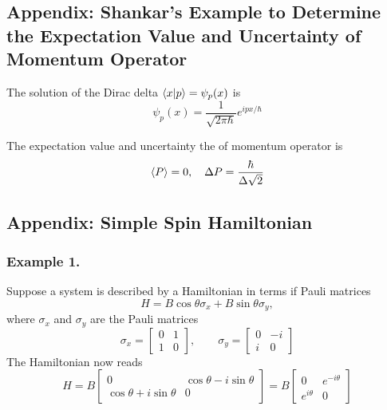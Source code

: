 \documentclass[../../../main.tex]{subfiles}
\begin{document}
\subsection{Appendix: Shankar's Example to Determine the Expectation Value and Uncertainty of Momentum Operator}
The solution of the Dirac delta $\braket{x|p}=\psi_p(x)$ is
\begin{equation*}
    \psi_p(x)=\frac{1 }{\sqrt{2\pi \hbar}}e^{ipx/\hbar}
\end{equation*}

The expectation value and uncertainty the of momentum operator is
\begin{equation*}
    \braket{P}=0,\quad\Delta P=\frac{\hbar}{\Delta\sqrt{2}}
\end{equation*}

\subsection{Appendix: Simple Spin Hamiltonian}
\subsubsection{Example 1.}
Suppose a system is described by a Hamiltonian in terms if Pauli matrices
\begin{equation*}
    H = B \cos \theta \sigma_x + B \sin \theta \sigma_y,
\end{equation*}
where \(\sigma_x\) and \(\sigma_y\) are the Pauli matrices
\begin{equation*}
    \sigma_x = \begin{bmatrix}
        0 & 1 \\
        1 & 0
    \end{bmatrix}, \qquad
    \sigma_y = \begin{bmatrix}
        0 & -i \\
        i & 0
    \end{bmatrix}
\end{equation*}
The Hamiltonian now reads
\begin{equation*}
    H = B \begin{bmatrix}
        0                           & \cos \theta - i \sin \theta \\
        \cos \theta + i \sin \theta & 0
    \end{bmatrix}
    =
    B \begin{bmatrix}
        0           & e^{-i\theta} \\
        e^{i\theta} & 0
    \end{bmatrix}
\end{equation*}
\end{document}
